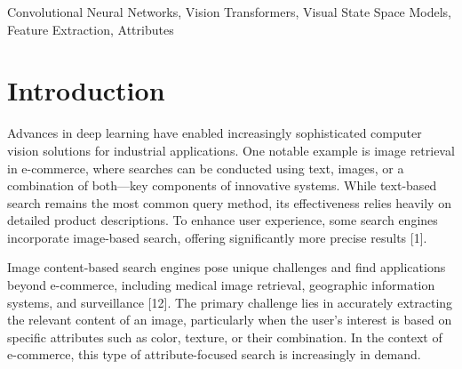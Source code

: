 \documentclass[conference]{IEEEtran}
\begin{document}
\begin{abstract}
This study investigates the hierarchical feature extraction capabilities of modern pre-trained neural network architectures for visual attribute recognition, specifically targeting color and texture attributes in clothing images. We evaluate four distinct backbone architectures representing different paradigms: VGG-16 and ResNet-50 as classical convolutional neural networks, iBOT as a self-supervised Vision Transformer, and VMamba as a Visual State Space Model. Features are extracted from intermediate layers of each architecture and evaluated using k-Nearest Neighbors classification with 5-fold cross-validation. Our experiments reveal that different architectural depths exhibit varying sensitivities to color and texture attributes, with early layers consistently capturing color information while deeper layers better represent texture patterns. Results demonstrate that iBOT achieves the best texture recognition (97.2\% at block 9) while ResNet-50 and iBOT tie for color recognition (95.9\%). These findings provide insights into layer-wise feature specialization across different neural network paradigms and practical guidance for attribute-specific image retrieval systems.

\end{abstract}

\begin{IEEEkeywords}
Convolutional Neural Networks, Vision Transformers, Visual State Space Models, Feature Extraction, Attributes
\end{IEEEkeywords}

\section{Introduction}
Advances in deep learning have enabled increasingly sophisticated computer vision solutions for industrial applications. One notable example is image retrieval in e-commerce, where searches can be conducted using text, images, or a combination of both—key components of innovative systems. While text-based search remains the most common query method, its effectiveness relies heavily on detailed product descriptions. To enhance user experience, some search engines incorporate image-based search, offering significantly more precise results [1].

Image content-based search engines pose unique challenges and find applications beyond e-commerce, including medical image retrieval, geographic information systems, and surveillance [12]. The primary challenge lies in accurately extracting the relevant content of an image, particularly when the user's interest is based on specific attributes such as color, texture, or their combination. In the context of e-commerce, this type of attribute-focused search is increasingly in demand.
\end{document}
